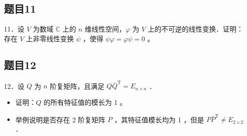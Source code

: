 \documentclass{article}
\begin{document}
\subsection{题目11}
11．设 \(V\) 为数域 \(\mathbb{C}\) 上的 \(n\) 维线性空间，\(\varphi\) 为 \(V\) 上的不可逆的线性变换．证明：存在 \(V\) 上非零线性变换 \(\psi\) ，使得 \(\psi \varphi=\varphi \psi=0\) 。

\subsection{题目12}
12．设 \(Q\) 为 \(n\) 阶复矩阵，且满足 \(Q \bar{Q}^{\mathrm{T}}=E_{n \times n}\) ．

\begin{itemize}
  \item[（1）] 证明：\(Q\) 的所有特征值的模长为 1 。
  \item[（2）] 举例说明是否存在 2 阶复矩阵 \(P\) ，其特征值模长均为 1 ，但是 \(P \bar{P}^{\mathrm{T}} \neq E_{2 \times 2}\) ．
\end{itemize}
\end{document}

